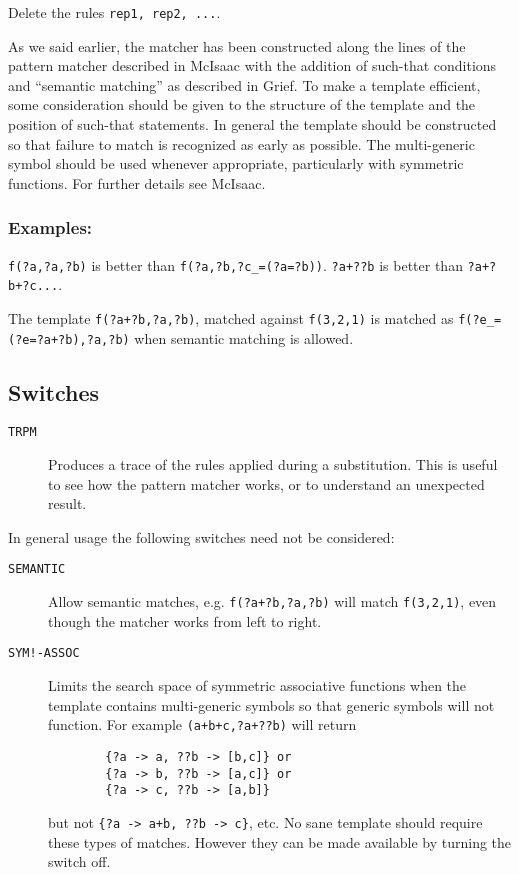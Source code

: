 Delete the rules \texttt{rep1, rep2, ...}.

As we said earlier, the matcher has been constructed along the lines of the
pattern matcher described in McIsaac with the addition of such-that conditions
and ``semantic matching'' as described in Grief.  To make a template efficient,
some consideration should be given to the structure of the template and the
position of such-that statements.  In general the template should be constructed
so that failure to match is recognized as early as possible.  The multi-generic
symbol should be used whenever appropriate, particularly with symmetric
functions.  For further details see McIsaac.

\subsubsection*{Examples:}

\texttt{f(?a,?a,?b)} is better than \texttt{f(?a,?b,?c\_=(?a=?b))}.
\texttt{?a+??b} is better than \texttt{?a+?b+?c...}.

The template \texttt{f(?a+?b,?a,?b)}, matched against \texttt{f(3,2,1)} is
matched as \texttt{f(?e\_=(?e=?a+?b),?a,?b)} when semantic matching is allowed.


\subsection{Switches}

\begin{description}
  \item[\texttt{TRPM}] Produces a trace of the rules applied during a
    substitution.  This is useful to see how the pattern matcher works, or to
    understand an unexpected result.
\end{description}
In general usage the following switches need not be considered:
\begin{description}
  \item[\texttt{SEMANTIC}] Allow semantic matches, e.g. \texttt{f(?a+?b,?a,?b)}
    will match \texttt{f(3,2,1)}, even though the matcher works from left to
    right.
  \item[\texttt{SYM!-ASSOC}] Limits the search space of symmetric associative
    functions when the template contains multi-generic symbols so that generic
    symbols will not function. For example \texttt{(a+b+c,?a+??b)} will return
      \begin{verbatim}
        {?a -> a, ??b -> [b,c]} or
        {?a -> b, ??b -> [a,c]} or
        {?a -> c, ??b -> [a,b]}
      \end{verbatim}
    but not \texttt{\{?a -> a+b, ??b -> c\}}, etc.  No sane template should
    require these types of matches.  However they can be made available by
    turning the switch off.
\end{description}
